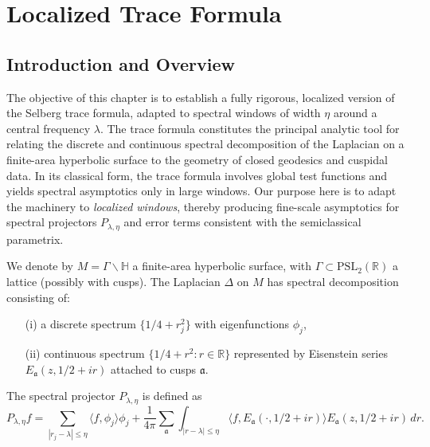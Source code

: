 
\chapter{Localized Trace Formula}

\section{Introduction and Overview}

\noindent
The objective of this chapter is to establish a fully rigorous,
localized version of the Selberg trace formula,
adapted to spectral windows of width $\eta$ around a central frequency $\lambda$.
The trace formula constitutes the principal analytic tool
for relating the discrete and continuous spectral decomposition
of the Laplacian on a finite-area hyperbolic surface
to the geometry of closed geodesics and cuspidal data.
In its classical form, the trace formula involves global test functions
and yields spectral asymptotics only in large windows.
Our purpose here is to adapt the machinery to \emph{localized windows},
thereby producing fine-scale asymptotics for spectral projectors
$P_{\lambda,\eta}$ and error terms consistent with the semiclassical parametrix.

\medskip

\noindent
We denote by $M=\Gamma\backslash\mathbb{H}$ a finite-area hyperbolic surface,
with $\Gamma\subset\mathrm{PSL}_2(\mathbb{R})$ a lattice (possibly with cusps).
The Laplacian $\Delta$ on $M$ has spectral decomposition consisting of:
\begin{itemize}
  \item[(i)] a discrete spectrum $\{1/4+r_j^2\}$ with eigenfunctions $\phi_j$,
  \item[(ii)] continuous spectrum $\{1/4+r^2:r\in\mathbb{R}\}$ represented by Eisenstein series $E_\mathfrak{a}(z,1/2+ir)$ attached to cusps $\mathfrak{a}$.
\end{itemize}
The spectral projector $P_{\lambda,\eta}$ is defined as
\[
  P_{\lambda,\eta}f = \sum_{|r_j-\lambda|\le \eta}\langle f,\phi_j\rangle\phi_j
  + \frac{1}{4\pi}\sum_{\mathfrak{a}}\int_{|r-\lambda|\le\eta}
  \langle f,E_\mathfrak{a}(\cdot,1/2+ir)\rangle E_\mathfrak{a}(z,1/2+ir)\,dr.
\]

\medskip


